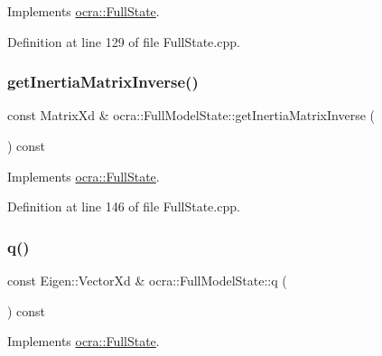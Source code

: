 Implements \hyperlink{classocra_1_1FullState_a5d5c2ddfaf4868f78b4621d27b500784}{ocra\+::\+Full\+State}.



Definition at line 129 of file Full\+State.\+cpp.

\hypertarget{classocra_1_1FullModelState_adf7ce7128a112c3f2b6367b6c0f6b9a2}{}\label{classocra_1_1FullModelState_adf7ce7128a112c3f2b6367b6c0f6b9a2} 
\subsubsection{\texorpdfstring{get\+Inertia\+Matrix\+Inverse()}{getInertiaMatrixInverse()}}
{\footnotesize\ttfamily const Matrix\+Xd \& ocra\+::\+Full\+Model\+State\+::get\+Inertia\+Matrix\+Inverse (\begin{DoxyParamCaption}{ }\end{DoxyParamCaption}) const\hspace{0.3cm}{\ttfamily [virtual]}}



Implements \hyperlink{classocra_1_1FullState_a10f3a888554035bf13b3f636ce4b4edc}{ocra\+::\+Full\+State}.



Definition at line 146 of file Full\+State.\+cpp.

\hypertarget{classocra_1_1FullModelState_a3a560064b1be8bd1579382aa08686904}{}\label{classocra_1_1FullModelState_a3a560064b1be8bd1579382aa08686904} 
\subsubsection{\texorpdfstring{q()}{q()}}
{\footnotesize\ttfamily const Eigen\+::\+Vector\+Xd \& ocra\+::\+Full\+Model\+State\+::q (\begin{DoxyParamCaption}{ }\end{DoxyParamCaption}) const\hspace{0.3cm}{\ttfamily [virtual]}}



Implements \hyperlink{classocra_1_1FullState_a3bb03b513d7cb3a5447d1d4eb2d643b0}{ocra\+::\+Full\+State}.



